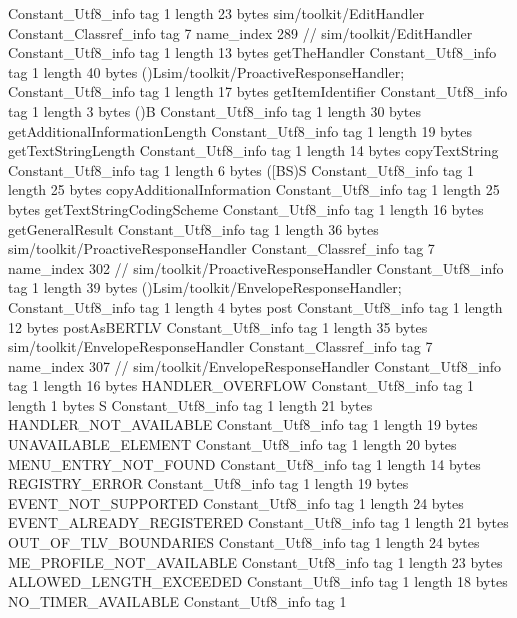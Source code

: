 {{{		}
		Constant_Utf8_info {
			tag	1
			length	23
			bytes	sim/toolkit/EditHandler
		}
		Constant_Classref_info {
			tag	7
			name_index	289		// sim/toolkit/EditHandler
		}
		Constant_Utf8_info {
			tag	1
			length	13
			bytes	getTheHandler
		}
		Constant_Utf8_info {
			tag	1
			length	40
			bytes	()Lsim/toolkit/ProactiveResponseHandler;
		}
		Constant_Utf8_info {
			tag	1
			length	17
			bytes	getItemIdentifier
		}
		Constant_Utf8_info {
			tag	1
			length	3
			bytes	()B
		}
		Constant_Utf8_info {
			tag	1
			length	30
			bytes	getAdditionalInformationLength
		}
		Constant_Utf8_info {
			tag	1
			length	19
			bytes	getTextStringLength
		}
		Constant_Utf8_info {
			tag	1
			length	14
			bytes	copyTextString
		}
		Constant_Utf8_info {
			tag	1
			length	6
			bytes	([BS)S
		}
		Constant_Utf8_info {
			tag	1
			length	25
			bytes	copyAdditionalInformation
		}
		Constant_Utf8_info {
			tag	1
			length	25
			bytes	getTextStringCodingScheme
		}
		Constant_Utf8_info {
			tag	1
			length	16
			bytes	getGeneralResult
		}
		Constant_Utf8_info {
			tag	1
			length	36
			bytes	sim/toolkit/ProactiveResponseHandler
		}
		Constant_Classref_info {
			tag	7
			name_index	302		// sim/toolkit/ProactiveResponseHandler
		}
		Constant_Utf8_info {
			tag	1
			length	39
			bytes	()Lsim/toolkit/EnvelopeResponseHandler;
		}
		Constant_Utf8_info {
			tag	1
			length	4
			bytes	post
		}
		Constant_Utf8_info {
			tag	1
			length	12
			bytes	postAsBERTLV
		}
		Constant_Utf8_info {
			tag	1
			length	35
			bytes	sim/toolkit/EnvelopeResponseHandler
		}
		Constant_Classref_info {
			tag	7
			name_index	307		// sim/toolkit/EnvelopeResponseHandler
		}
		Constant_Utf8_info {
			tag	1
			length	16
			bytes	HANDLER_OVERFLOW
		}
		Constant_Utf8_info {
			tag	1
			length	1
			bytes	S
		}
		Constant_Utf8_info {
			tag	1
			length	21
			bytes	HANDLER_NOT_AVAILABLE
		}
		Constant_Utf8_info {
			tag	1
			length	19
			bytes	UNAVAILABLE_ELEMENT
		}
		Constant_Utf8_info {
			tag	1
			length	20
			bytes	MENU_ENTRY_NOT_FOUND
		}
		Constant_Utf8_info {
			tag	1
			length	14
			bytes	REGISTRY_ERROR
		}
		Constant_Utf8_info {
			tag	1
			length	19
			bytes	EVENT_NOT_SUPPORTED
		}
		Constant_Utf8_info {
			tag	1
			length	24
			bytes	EVENT_ALREADY_REGISTERED
		}
		Constant_Utf8_info {
			tag	1
			length	21
			bytes	OUT_OF_TLV_BOUNDARIES
		}
		Constant_Utf8_info {
			tag	1
			length	24
			bytes	ME_PROFILE_NOT_AVAILABLE
		}
		Constant_Utf8_info {
			tag	1
			length	23
			bytes	ALLOWED_LENGTH_EXCEEDED
		}
		Constant_Utf8_info {
			tag	1
			length	18
			bytes	NO_TIMER_AVAILABLE
		}
		Constant_Utf8_info {
			tag	1
}}}
